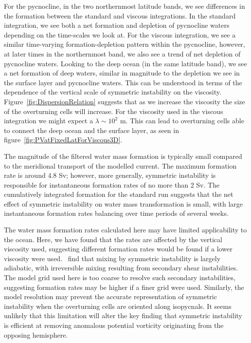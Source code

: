 For the pycnocline, in the two northernmost latitude bands, we see differences in the formation between the standard and viscous integrations. In the standard integration, we see both a net formation and depletion of pycnocline waters depending on the time-scales we look at. For the viscous integration, we see a similar time-varying formation-depletion pattern within the pycnocline, however, at later times in the northernmost band, we also see a trend of net depletion of pycnocline waters. Looking to the deep ocean (in the same latitude band), we see a net formation of deep waters, similar in magnitude to the depletion we see in the surface layer and pycnocline waters. This can be understood in terms of the dependence of the vertical scale of symmetric instability on the viscosity. Figure~\ref{fig:DispersionRelation} suggests that as we increase the viscosity the size of the overturning cells will increase. For the viscosity used in the viscous integration we might expect a $\lambda \sim 10^2$ m. This can lead to overturning cells able to connect the deep ocean and the surface layer, as seen in figure~\ref{fig:PVatFixedLatForViscous3D}.

The magnitude of the filtered water mass formation is typically small compared to the meridional transport of the modelled current. The maximum formation rate is around 4.8 Sv; however, more generally, symmetric instability is responsible for instantaneous formation rates of no more than 2 Sv. The cumulatively integrated formation for the standard run suggests that the net effect of symmetric instability on water mass transformation is small, with large instantaneous formation rates balancing over time periods of several weeks.

The water mass formation rates calculated here may have limited applicability to the ocean. Here, we have found that the rates are affected by the vertical viscosity used, suggesting different formation rates would be found if a lower viscosity were used.~\citet{Yankovsky2019} find that mixing by symmetric instability is largely adiabatic, with irreversible mixing resulting from secondary shear instabilities. The model grid used here is too coarse to resolve such secondary instabilities, suggesting formation rates may be higher if a finer grid were used. Similarly, the model resolution may prevent the accurate representation of symmetric instability when the overturning cells are oriented along isopycnals. It seems unlikely that this limitation will alter the key finding that symmetric instability is efficient at removing anomalous potential vorticity originating from the opposing hemisphere.


